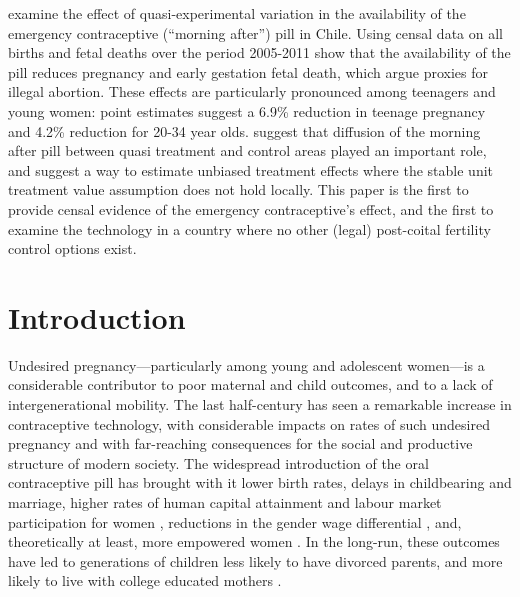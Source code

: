 \begin{chapabstract}
\Person examine the effect of quasi-experimental variation in the availability
of the emergency contraceptive (``morning after'') pill in Chile.  Using censal
data on all births and fetal deaths over the period 2005-2011 \person show that
the availability of the pill reduces pregnancy and early gestation fetal death,
which \person argue proxies for illegal abortion.  These effects are 
particularly pronounced among teenagers and young women: point estimates suggest
a 6.9\% reduction in teenage pregnancy and 4.2\% reduction for 20-34 year olds.   
\Person suggest that diffusion of the morning after pill between quasi treatment 
and control areas played an important role, and suggest a way to estimate 
unbiased treatment effects where the stable unit treatment value assumption does 
not hold locally. This paper is the first to provide censal evidence of the
emergency contraceptive's effect, and the first to examine the technology in a
country where no other (legal) post-coital fertility control options exist. 
\end{chapabstract}


\section{Introduction}
Undesired pregnancy---particularly among young and adolescent women---is a
considerable contributor to poor maternal and child outcomes, and to a lack of
intergenerational mobility.  The last half-century has seen a remarkable 
increase in contraceptive technology, with considerable impacts on rates of such
undesired pregnancy and with far-reaching consequences for the social and 
productive structure of modern society. The widespread introduction of the oral 
contraceptive pill has brought with it lower birth rates, delays in childbearing 
and marriage, higher rates of human capital attainment and labour market 
participation for women \citep{AngristEvans1996,Bailey2006,GoldinKatz2002a,
GoldinKatz2002b}, reductions in the gender wage differential 
\citep{Baileyetal2012}, and, theoretically at least, more empowered women 
\citep{ChiapporiOreffice2008}.  In the long-run, these outcomes have led to 
generations of children less likely to have divorced parents, and more likely to 
live with college educated mothers \citep{OltmansHungerman2012}.

